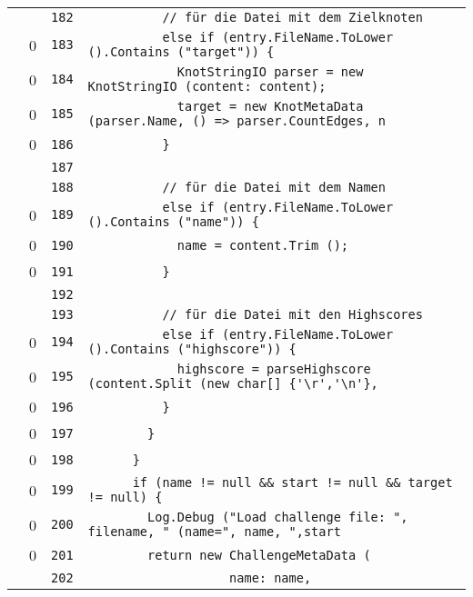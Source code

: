 \documentclass[a4paper,10pt]{article}
\begin{document}
\begin{longtable}[l]{lrrl}
\cellcolor{gray} &  & \verb~182~ & \verb~          // für die Datei mit dem Zielknoten~\\
\cellcolor{red} & 0 & \verb~183~ & \verb~          else if (entry.FileName.ToLower ().Contains ("target")) {~\\
\cellcolor{red} & 0 & \verb~184~ & \verb~            KnotStringIO parser = new KnotStringIO (content: content);~\\
\cellcolor{red} & 0 & \verb~185~ & \verb~            target = new KnotMetaData (parser.Name, () => parser.CountEdges, n~\\
\cellcolor{red} & 0 & \verb~186~ & \verb~          }~\\
\cellcolor{gray} &  & \verb~187~ & \verb~~\\
\cellcolor{gray} &  & \verb~188~ & \verb~          // für die Datei mit dem Namen~\\
\cellcolor{red} & 0 & \verb~189~ & \verb~          else if (entry.FileName.ToLower ().Contains ("name")) {~\\
\cellcolor{red} & 0 & \verb~190~ & \verb~            name = content.Trim ();~\\
\cellcolor{red} & 0 & \verb~191~ & \verb~          }~\\
\cellcolor{gray} &  & \verb~192~ & \verb~~\\
\cellcolor{gray} &  & \verb~193~ & \verb~          // für die Datei mit den Highscores~\\
\cellcolor{red} & 0 & \verb~194~ & \verb~          else if (entry.FileName.ToLower ().Contains ("highscore")) {~\\
\cellcolor{red} & 0 & \verb~195~ & \verb~            highscore = parseHighscore (content.Split (new char[] {'\r','\n'},~\\
\cellcolor{red} & 0 & \verb~196~ & \verb~          }~\\
\cellcolor{red} & 0 & \verb~197~ & \verb~        }~\\
\cellcolor{red} & 0 & \verb~198~ & \verb~      }~\\
\cellcolor{red} & 0 & \verb~199~ & \verb~      if (name != null && start != null && target != null) {~\\
\cellcolor{red} & 0 & \verb~200~ & \verb~        Log.Debug ("Load challenge file: ", filename, " (name=", name, ",start~\\
\cellcolor{red} & 0 & \verb~201~ & \verb~        return new ChallengeMetaData (~\\
\cellcolor{gray} &  & \verb~202~ & \verb~                   name: name,~\\

\end{longtable}
\end{document}
